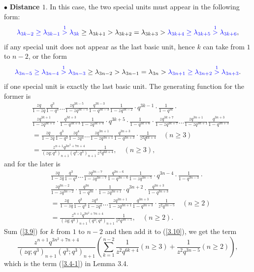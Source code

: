 \documentclass[draft]{amsart}
\numberwithin{equation}{section}
\theoremstyle{plain}
\theoremstyle{remark}
\begin{document}
$\bullet$ {\bf Distance $1.$}
In this case, the two special  units must appear in the following form:
$$
{\color{blue}\lambda_{3k-2}  \geq \lambda_{3k-1} \overset{1}{>} \lambda_{3k}} \geq  \lambda_{3k+1} > \lambda_{3k+2} = \lambda_{3k+3} > {\color{blue} \lambda_{3k+4} \geq \lambda_{3k+5}\overset{1}{>}  \lambda_{3k+6}} ,
$$
if any special unit  does not  appear as the last basic unit, hence $k$ can take from $1$ to $n-2$, or the form
$$
{\color{blue}\lambda_{3n-5}  \geq \lambda_{3n-4} \overset{1}{>} \lambda_{3n-3}} \geq  \lambda_{3n-2} > \lambda_{3n-1} = \lambda_{3n} > {\color{blue} \lambda_{3n+1} \geq \lambda_{3n+2}\overset{1}{>}  \lambda_{3n+3}}.
$$
if one special unit is exactly the last basic unit. The generating function for the former is
\begin{align}
 &\frac{zq}{1-zq}\frac{q^{3}}{1-q^{3}}\dots\frac{zq^{3k-5}}{1-zq^{3k-5}}\frac{q^{3k-3}}{1-q^{3k-3}}
 \frac{1}{1-zq^{3k-2}}\cdot q^{3k-1}\cdot\frac{1}{1-q^{3k}}\cdot\nonumber\\
 &\frac{zq^{3k+1}}{1-zq^{3k+1}}\cdot \frac{q^{3k+3}}{1-q^{3k+3}}
 \frac{1}{1-zq^{3k+4}}\cdot q^{3k+5}\cdot\frac{1}{1-q^{3k+6}}
\cdot\frac{zq^{3k+7}}{1-zq^{3k+7}}\dots\frac{zq^{3n+1}}{1-zq^{3n+1}}\frac{q^{3n+3}}{1-q^{3n+3}}\nonumber\\
&= \frac{zq}{1-zq}\frac{q^{3}}{1-q^{3}} \frac{zq^{4}}{1-zq^{4}}\dots\frac{zq^{3n+1}}{1-zq^{3n+1}} \frac{q^{3n+3}}{1-q^{3n+3}}\cdot\frac{1}{z^{2}q^{6k+4}} \quad (n \geq 3)\nonumber\\
&=\frac{z^{n+1}q^{3n^{2}+7n+4}}{(zq;q^{3})_{n+1}(q^{3};q^{3})_{n+1}}\frac{1}{z^{2}q^{6k+4}}, \quad(n\geq3),\label{3.9}
\end{align}
 and for the later is
\begin{align}
 &\frac{zq}{1-zq}\frac{q^{3}}{1-q^{3}}\dots\frac{zq^{3n-7}}{1-zq^{3n-7}}\frac{q^{3n-6}}{1-q^{3n-6}}
 \frac{1}{1-zq^{3n-5}}\cdot q^{3n-4}\cdot\frac{1}{1-q^{3n-3}}\cdot\nonumber\\
 &\frac{zq^{3n-2}}{1-zq^{3n-2}}\cdot \frac{q^{3n}}{1-q^{3n}}\cdot\frac{1}{1-zq^{3n+1}}\cdot q^{3n+2}\cdot\frac{q^{3n+3}}{1-q^{3n+3}}\nonumber\\
&= \frac{zq}{1-zq}\frac{q^{3}}{1-q^{3}} \frac{zq^{4}}{1-zq^{4}}\dots\frac{zq^{3n+1}}{1-zq^{3n+1}} \frac{q^{3n+3}}{1-q^{3n+3}}\cdot\frac{1}{z^{2}q^{3n-5}}  \quad( n\geq 2)\nonumber\\
&=\frac{z^{n+1}q^{3n^{2}+7n+4}}{(zq;q^{3})_{n+1}(q^{3};q^{3})_{n+1}}\frac{1}{z^{2}q^{3n-5}}, \quad(n\geq2).\label{3.10}
\end{align}
Sum (\ref{3.9}) for $k$ from $1$ to $n-2$ and then add it to (\ref{3.10}), we get the term
\begin{equation*}
\frac{z^{n+1}q^{3n^{2}+7n+4}}{(zq;q^{3})_{n+1}(q^{3};q^{3})_{n+1}}\left( \sum_{k=1} ^{n-2}\frac{1}{z^{2}q^{6k+4}}(n\geq 3)+\frac{1}{z^{2}q^{3n-5}}(n\geq 2)\right),
\end{equation*}
 which is the term (\ref{3.4-1}) in Lemma 3.4.
 
\end{document}

